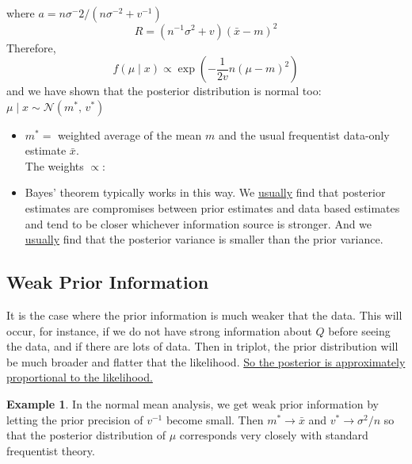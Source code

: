 \documentclass[lecture,12pt,]{pcms-l}
\numberwithin{section}{chapter}
\numberwithin{equation}{chapter}
\theoremstyle{plain}
\theoremstyle{definition}
\newtheorem{example}{Example}[section]
\theoremstyle{definition}
\begin{document}
where $a=n \sigma^-2/(n \sigma^{-2}+v^{-1})$
\begin{equation}
R=(n^{-1}\sigma^2+v)(\bar{x}-m)^2
\end{equation}
Therefore,
\begin{equation}
f(\mu \mid x) \propto \exp\left (  -\frac{1}{2 v}n(\mu-m)^2 \right )
\end{equation}
and we have shown that the posterior distribution is normal too: $\mu \mid x \sim \mathcal{N}(m^*,\,v^*)$
\begin{itemize}
\item $m^*=$ weighted average of the mean $m$ and the usual frequentist data-only estimate $\bar{x}$. 
\\
The weights $\propto$:
\item Bayes' theorem typically works in this way. We \underline{usually} find that posterior estimates are compromises between prior estimates and data based estimates and tend to be closer whichever information source is stronger. And we \underline{usually} find that the posterior variance is smaller than the prior variance.
\end{itemize}
\subsection{Weak Prior Information}
It is the case where the prior information is much weaker that the data. This will occur, for instance, if we do not have strong information about $Q$ before seeing the  data, and if there are lots of data. Then in triplot, the prior distribution will be much broader and flatter that the likelihood. \underline{So the posterior is approximately proportional to the likelihood.}
\begin{example}
In the normal mean analysis, we get weak prior information by letting the prior precision of $v^{-1}$ become small. Then $m^* \rightarrow \bar{x}$ and $v^* \rightarrow \sigma^2/n$ so that the posterior distribution of $\mu$ corresponds very closely with standard frequentist theory.
\end{example}



\vfill
\eject
\end{document}
